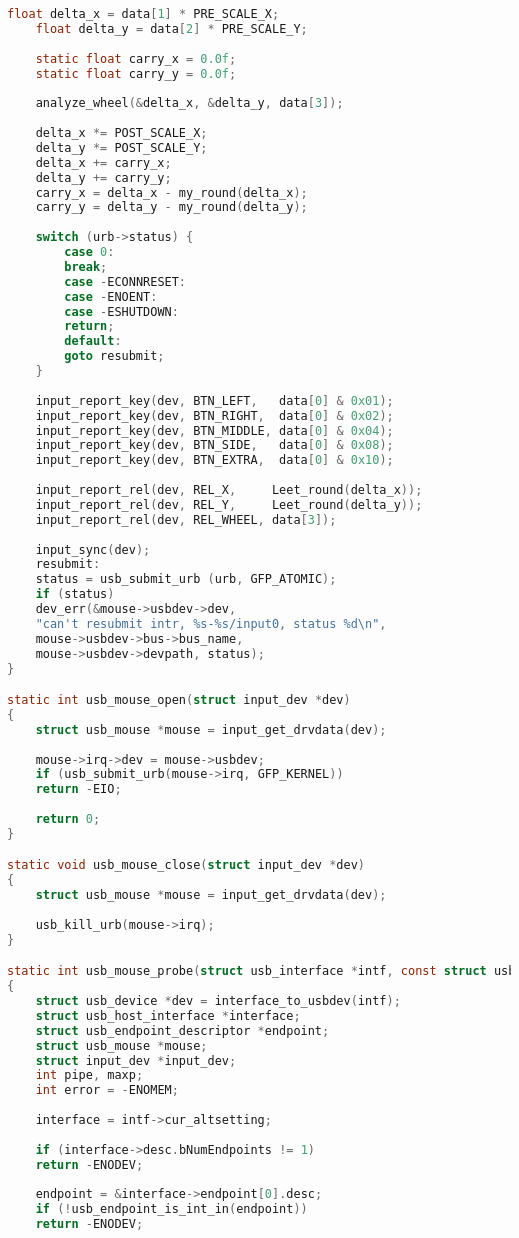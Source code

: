 \begin{lstlisting}[language=C, label=lst:all, caption=Полный код драйвера]
	float delta_x = data[1] * PRE_SCALE_X;
	float delta_y = data[2] * PRE_SCALE_Y;
	
	static float carry_x = 0.0f;
	static float carry_y = 0.0f;
	
	analyze_wheel(&delta_x, &delta_y, data[3]);
	
	delta_x *= POST_SCALE_X;
	delta_y *= POST_SCALE_Y;
	delta_x += carry_x;
	delta_y += carry_y;
	carry_x = delta_x - my_round(delta_x);
	carry_y = delta_y - my_round(delta_y);
	
	switch (urb->status) {
		case 0:	
		break;
		case -ECONNRESET:
		case -ENOENT:
		case -ESHUTDOWN:
		return;
		default:
		goto resubmit;
	}
	
	input_report_key(dev, BTN_LEFT,   data[0] & 0x01);
	input_report_key(dev, BTN_RIGHT,  data[0] & 0x02);
	input_report_key(dev, BTN_MIDDLE, data[0] & 0x04);
	input_report_key(dev, BTN_SIDE,   data[0] & 0x08);
	input_report_key(dev, BTN_EXTRA,  data[0] & 0x10);
	
	input_report_rel(dev, REL_X,     Leet_round(delta_x));
	input_report_rel(dev, REL_Y,     Leet_round(delta_y));
	input_report_rel(dev, REL_WHEEL, data[3]);
	
	input_sync(dev);
	resubmit:
	status = usb_submit_urb (urb, GFP_ATOMIC);
	if (status)
	dev_err(&mouse->usbdev->dev,
	"can't resubmit intr, %s-%s/input0, status %d\n",
	mouse->usbdev->bus->bus_name,
	mouse->usbdev->devpath, status);
}

static int usb_mouse_open(struct input_dev *dev)
{
	struct usb_mouse *mouse = input_get_drvdata(dev);
	
	mouse->irq->dev = mouse->usbdev;
	if (usb_submit_urb(mouse->irq, GFP_KERNEL))
	return -EIO;
	
	return 0;
}

static void usb_mouse_close(struct input_dev *dev)
{
	struct usb_mouse *mouse = input_get_drvdata(dev);
	
	usb_kill_urb(mouse->irq);
}

static int usb_mouse_probe(struct usb_interface *intf, const struct usb_device_id *id)
{
	struct usb_device *dev = interface_to_usbdev(intf);
	struct usb_host_interface *interface;
	struct usb_endpoint_descriptor *endpoint;
	struct usb_mouse *mouse;
	struct input_dev *input_dev;
	int pipe, maxp;
	int error = -ENOMEM;
	
	interface = intf->cur_altsetting;
	
	if (interface->desc.bNumEndpoints != 1)
	return -ENODEV;
	
	endpoint = &interface->endpoint[0].desc;
	if (!usb_endpoint_is_int_in(endpoint))
	return -ENODEV;
	

\end{lstlisting}
